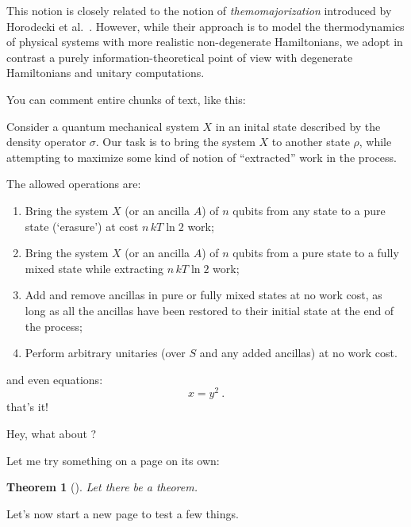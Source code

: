 \documentclass[10pt,a4paper,aps,reprint,notitlepage,nofootinbib]{revtex4-1}
\newtheorem{theorem}{Theorem}
\begin{document}
This notion is closely related to the notion of {\em themomajorization}
introduced by Horodecki et al.~\cite{Horodecki2013_ThermoMaj}. However, while
their approach is to model the thermodynamics of physical systems with more
realistic non-degenerate Hamiltonians, we adopt in contrast a purely
information-theoretical point of view with degenerate Hamiltonians and unitary
computations.

\phf* You can comment entire chunks of text, like this:

Consider a quantum mechanical system $X$ in an inital state described by the
density operator $\sigma$.   Our task is to
bring the system $X$ to another state $\rho$, while attempting to maximize some
kind of notion of ``extracted'' work in the process.

The allowed operations are:
\begin{enumerate}[label=(\alph*)]
\item Bring the system $X$ (or an ancilla $A$) of $n$ qubits from any state to a pure state (`erasure') at
  cost $n\,kT\ln 2$ work;
\item Bring the system $X$ (or an ancilla $A$) of $n$ qubits from a pure state to a fully mixed state while
  extracting $n\,kT\ln 2$ work;
\item Add and remove ancillas in pure or fully mixed states at no work cost, as long as all the ancillas have
  been restored to their initial state at the end of the process;
\item Perform arbitrary unitaries (over $S$ and any added ancillas) at no work cost.
\end{enumerate}

and even equations:
\begin{equation}
  x = y^2\ .
\end{equation}
that's it! \endphf

Hey, what about ?




\clearpage
Let me try something on a page on its own:
\begin{theorem}[]
  Let there be a theorem.
\end{theorem}


\clearpage
\onecolumngrid
Let's now start a new page to test a few things.
\end{document}
